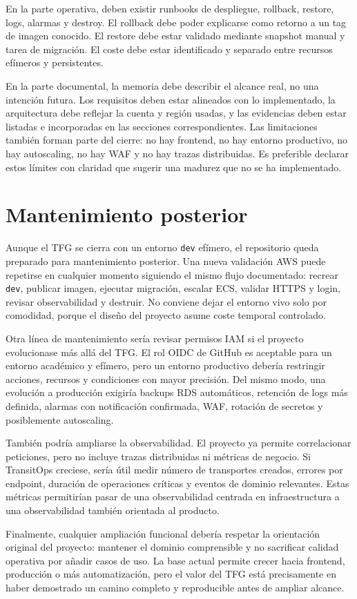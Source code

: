 En la parte operativa, deben existir runbooks de despliegue, rollback, restore, logs, alarmas y destroy. El rollback debe poder explicarse como retorno a un tag de imagen conocido. El restore debe estar validado mediante snapshot manual y tarea de migración. El coste debe estar identificado y separado entre recursos efímeros y persistentes.

En la parte documental, la memoria debe describir el alcance real, no una intención futura. Los requisitos deben estar alineados con lo implementado, la arquitectura debe reflejar la cuenta y región usadas, y las evidencias deben estar listadas e incorporadas en las secciones correspondientes. Las limitaciones también forman parte del cierre: no hay frontend, no hay entorno productivo, no hay autoscaling, no hay WAF y no hay trazas distribuidas. Es preferible declarar estos límites con claridad que sugerir una madurez que no se ha implementado.

\section{Mantenimiento posterior}
\label{sec:anexo-mantenimiento-posterior}

Aunque el TFG se cierra con un entorno \texttt{dev} efímero, el repositorio queda preparado para mantenimiento posterior. Una nueva validación AWS puede repetirse en cualquier momento siguiendo el mismo flujo documentado: recrear \texttt{dev}, publicar imagen, ejecutar migración, escalar ECS, validar HTTPS y login, revisar observabilidad y destruir. No conviene dejar el entorno vivo solo por comodidad, porque el diseño del proyecto asume coste temporal controlado.

Otra línea de mantenimiento sería revisar permisos IAM si el proyecto evolucionase más allá del TFG. El rol OIDC de GitHub es aceptable para un entorno académico y efímero, pero un entorno productivo debería restringir acciones, recursos y condiciones con mayor precisión. Del mismo modo, una evolución a producción exigiría backups RDS automáticos, retención de logs más definida, alarmas con notificación confirmada, WAF, rotación de secretos y posiblemente autoscaling.

También podría ampliarse la observabilidad. El proyecto ya permite correlacionar peticiones, pero no incluye trazas distribuidas ni métricas de negocio. Si TransitOps creciese, sería útil medir número de transportes creados, errores por endpoint, duración de operaciones críticas y eventos de dominio relevantes. Estas métricas permitirían pasar de una observabilidad centrada en infraestructura a una observabilidad también orientada al producto.

Finalmente, cualquier ampliación funcional debería respetar la orientación original del proyecto: mantener el dominio comprensible y no sacrificar calidad operativa por añadir casos de uso. La base actual permite crecer hacia frontend, producción o más automatización, pero el valor del TFG está precisamente en haber demostrado un camino completo y reproducible antes de ampliar alcance.
